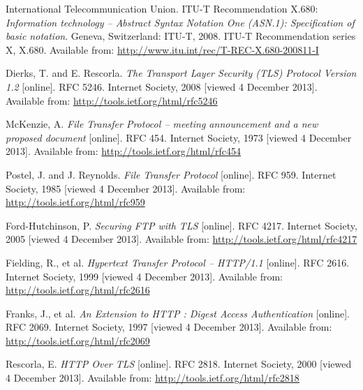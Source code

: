 
\def\bibname{Bibliography}
\begin{thebibliography}{99}
\addcontentsline{toc}{chapter}{\bibname}


	{\sc International Telecommunication Union}.
	ITU-T Recommendation X.680:
	\emph{Information technology -- Abstract Syntax Notation One (ASN.1): Specification of basic notation}.
	Geneva, Switzerland: ITU-T, 2008.
	ITU-T Recommendation series X, X.680.
	Available from: \url{http://www.itu.int/rec/T-REC-X.680-200811-I}

	{\sc Dierks,} T. and E. {\sc Rescorla}.
	\emph{The Transport Layer Security (TLS) Protocol Version 1.2}
	[online].
	RFC 5246.
	Internet Society, 2008 [viewed 4 December 2013].
	Available from: \url{http://tools.ietf.org/html/rfc5246}


	{\sc McKenzie,} A.
	\emph{File Transfer Protocol -- meeting announcement and a new proposed document}
	[online].
	RFC 454.
	Internet Society, 1973 [viewed 4 December 2013].
	Available from: \url{http://tools.ietf.org/html/rfc454}

	{\sc Postel,} J. and J. {\sc Reynolds}.
	\emph{File Transfer Protocol}
	[online].
	RFC 959.
	Internet Society, 1985 [viewed 4 December 2013].
	Available from: \url{http://tools.ietf.org/html/rfc959}

	{\sc Ford-Hutchinson,} P.
	\emph{Securing FTP with TLS}
	[online].
	RFC 4217.
	Internet Society, 2005 [viewed 4 December 2013].
	Available from: \url{http://tools.ietf.org/html/rfc4217}

	{\sc Fielding,} R., et al.
	\emph{Hypertext Transfer Protocol -- HTTP/1.1}
	[online].
	RFC 2616.
	Internet Society, 1999 [viewed 4 December 2013].
	Available from: \url{http://tools.ietf.org/html/rfc2616}

	{\sc Franks,} J., et al.
	\emph{An Extension to HTTP : Digest Access Authentication}
	[online].
	RFC 2069.
	Internet Society, 1997 [viewed 4 December 2013].
	Available from: \url{http://tools.ietf.org/html/rfc2069}

	{\sc Rescorla,} E.
	\emph{HTTP Over TLS}
	[online].
	RFC 2818.
	Internet Society, 2000 [viewed 4 December 2013].
	Available from: \url{http://tools.ietf.org/html/rfc2818}


\end{thebibliography}

